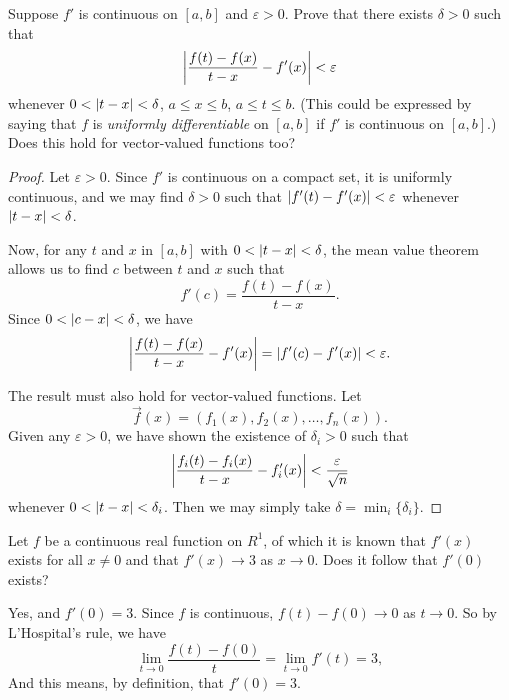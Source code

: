  Suppose $f'$ is continuous on $[a,b]$ and
$\varepsilon > 0$. Prove that there exists $\delta > 0$ such that
\begin{equation*}
  \left\lvert{\frac{f(t)-f(x)}{t-x} - f'(x)}\right\rvert < \varepsilon
\end{equation*}
whenever $0 < \lvert{t - x}\rvert < \delta$, $a\leq x\leq b$, $a\leq t\leq
b$. (This could be expressed by saying that $f$ is {\em uniformly
  differentiable} on $[a,b]$ if $f'$ is continuous on $[a,b]$.) Does
this hold for vector-valued functions too?
\begin{proof}
  Let $\varepsilon > 0$. Since $f'$ is continuous on a compact set, it
  is uniformly continuous, and we may find $\delta > 0$ such that
  $\lvert{f'(t) - f'(x)}\rvert < \varepsilon$ whenever $\lvert{t - x}\rvert < \delta$.

  Now, for any $t$ and $x$ in $[a,b]$ with $0 < \lvert{t - x}\rvert < \delta$,
  the mean value theorem allows us to find $c$ between $t$ and $x$
  such that
  \begin{equation*}
    f'(c) = \frac{f(t) - f(x)}{t - x}.
  \end{equation*}
  Since $0 < \lvert{c - x}\rvert < \delta$, we have
  \begin{equation*}
    \left\lvert{\frac{f(t) - f(x)}{t-x} - f'(x)}\right\rvert
    = \lvert{f'(c) - f'(x)}\rvert < \varepsilon.
  \end{equation*}

  The result must also hold for vector-valued functions. Let
  \begin{equation*}
    \vec{f}(x) = (f_1(x), f_2(x), \dots, f_n(x)).
  \end{equation*}
  Given any $\varepsilon > 0$, we have shown the existence of
  $\delta_i > 0$ such that
  \begin{equation*}
    \left\lvert{\frac{f_i(t) - f_i(x)}{t - x} - f_i'(x)}\right\rvert
    < \frac{\varepsilon}{\sqrt{n}}
  \end{equation*}
  whenever $0 < \lvert{t - x}\rvert < \delta_i$. Then we may simply take
  $\delta = \min_i\{\delta_i\}$.
\end{proof}

 Let $f$ be a continuous real function on $R^1$, of which it
is known that $f'(x)$ exists for all $x\neq0$ and that $f'(x)\to3$ as
$x\to0$. Does it follow that $f'(0)$ exists?
\begin{solution}
  Yes, and $f'(0) = 3$. Since $f$ is continuous, $f(t) - f(0)\to0$ as
  $t\to0$. So by L'Hospital's rule, we have
  \begin{equation*}
    \lim_{t\to 0}\frac{f(t) - f(0)}t
    = \lim_{t\to 0}f'(t) = 3,
  \end{equation*}
  And this means, by definition, that $f'(0) = 3$.
\end{solution}
